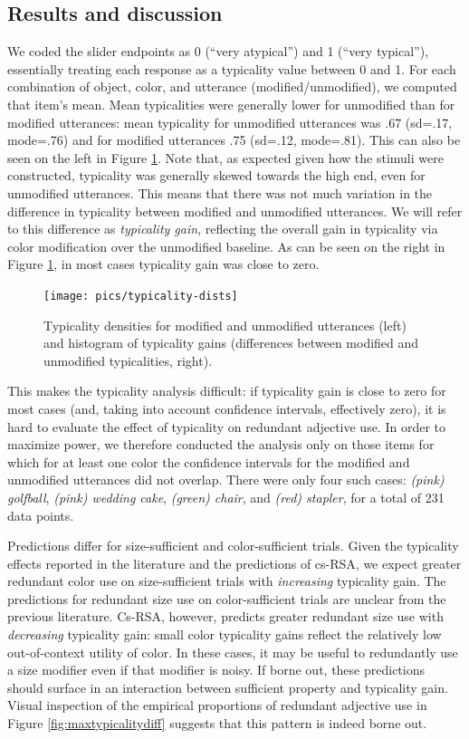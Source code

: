 \documentclass[11pt]{article}
\newcommand{\figref}[1]{Figure \ref{#1}}
\begin{document}
\subsection{Results and discussion}

We coded the slider endpoints as 0 (``very atypical'') and 1 (``very typical''), essentially treating each response as a typicality value between 0 and 1. For each combination of object, color, and utterance (modified/unmodified), we computed that item's mean. Mean typicalities were generally lower for unmodified than for modified utterances: mean typicality for unmodified utterances was .67 (sd=.17, mode=.76) and for modified utterances .75 (sd=.12, mode=.81). This can also be seen on the left in \figref{fig:typicalitydists}. Note that, as expected given how the stimuli were constructed, typicality was generally skewed towards the high end, even for unmodified utterances. This means that there was not much variation in  the difference in typicality between modified and unmodified utterances. We will refer to this difference as \emph{typicality gain}, reflecting the overall gain in typicality via color modification over the unmodified baseline. As can be seen on the right in \figref{fig:typicalitydists}, in most cases typicality gain was close to zero.

\begin{figure}
\centering
\texttt{[image: pics/typicality-dists]}
\caption{Typicality densities for modified and unmodified utterances (left) and histogram of typicality gains (differences between modified and unmodified typicalities, right).}
\label{fig:typicalitydists}
\end{figure}

This makes the typicality analysis difficult: if typicality gain is close to zero for most cases (and, taking into account confidence intervals, effectively zero), it is hard to evaluate the effect of typicality on redundant adjective use. In order to maximize power, we therefore conducted the analysis only on those items for which for at least one color the confidence intervals for the modified and unmodified utterances did not overlap. There were only four such cases: \emph{(pink) golfball}, \emph{(pink) wedding cake}, \emph{(green) chair}, and \emph{(red) stapler}, for a total of 231 data points.

Predictions differ for size-sufficient and color-sufficient trials. Given the typicality effects reported in the literature and the predictions of cs-RSA, we expect greater redundant color use on size-sufficient trials with \emph{increasing} typicality gain. The predictions for redundant size use on color-sufficient trials are unclear from the previous literature. Cs-RSA, however,  predicts greater redundant size use with \emph{decreasing} typicality gain: small color typicality gains reflect the relatively low out-of-context utility of color. In these cases, it may be useful to redundantly use a size modifier even if that modifier is noisy. If borne out, these predictions should surface in an interaction between sufficient property and typicality gain. Visual inspection of the empirical proportions of redundant adjective use in \figref{fig:maxtypicalitydiff} suggests that this pattern is indeed borne out.
\end{document}
